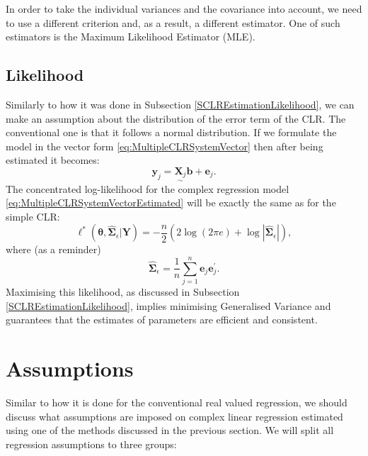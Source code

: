 \documentclass[
]{book}
\begin{document}
In order to take the individual variances and the covariance into account, we need to use a different criterion and, as a result, a different estimator. One of such estimators is the Maximum Likelihood Estimator (MLE).

\hypertarget{likelihood}{%
\subsection{Likelihood}\label{likelihood}}

Similarly to how it was done in Subsection \ref{SCLREstimationLikelihood}, we can make an assumption about the distribution of the error term of the CLR. The conventional one is that it follows a normal distribution. If we formulate the model in the vector form \eqref{eq:MultipleCLRSystemVector} then after being estimated it becomes:
\begin{equation}
    \mathbf{y}_j = \underset{\sim}{\mathbf{X}_j} \boldsymbol{b} + \boldsymbol{e}_j .
    \label{eq:MultipleCLRSystemVectorEstimated}
\end{equation}
The concentrated log-likelihood for the complex regression model \eqref{eq:MultipleCLRSystemVectorEstimated} will be exactly the same as for the simple CLR:
\begin{equation*}
    \ell^*(\boldsymbol{\theta}, \hat{\boldsymbol{\Sigma}}_\epsilon | \mathbf{Y}) = -\frac{n}{2} \left( 2 \log(2 \pi e) + \log | \hat{\boldsymbol{\Sigma}}_\epsilon | \right) ,
\end{equation*}
where (as a reminder)
\begin{equation*}
    \hat{\boldsymbol{\Sigma}}_\epsilon = \frac{1}{n} \sum_{j=1}^{n} \boldsymbol{e}_j \boldsymbol{e}_j^\prime .
\end{equation*}
Maximising this likelihood, as discussed in Subsection \ref{SCLREstimationLikelihood}, implies minimising Generalised Variance and guarantees that the estimates of parameters are efficient and consistent.

\hypertarget{assumptions}{%
\section{Assumptions}\label{assumptions}}

Similar to how it is done for the conventional real valued regression, we should discuss what assumptions are imposed on complex linear regression estimated using one of the methods discussed in the previous section. We will split all regression assumptions to three groups:
\end{document}
